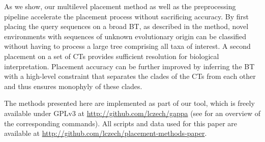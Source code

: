 As we show, our multilevel placement method as well as the preprocessing pipeline
accelerate the placement process without sacrificing accuracy.
By first placing the query sequences on a broad \acf{BT}, as described in the method,
novel environments with sequences of unknown evolutionary origin can be classified
without having to process a large tree comprising all taxa of interest.
A second placement on a set of \acfp{CT} provides sufficient %
resolution for biological interpretation.
Placement accuracy can be further improved by inferring the \ac{BT}
with a high-level constraint that separates the clades of the \acp{CT} from each other
and thus ensures monophyly of these clades.


The methods presented here are implemented as part of our  tool,
which is freely available under GPLv3 at \url{http://github.com/lczech/gappa}
(see  for an overview of the corresponding commands).
All scripts and data used for this paper are available at \url{http://github.com/lczech/placement-methods-paper}.


%

